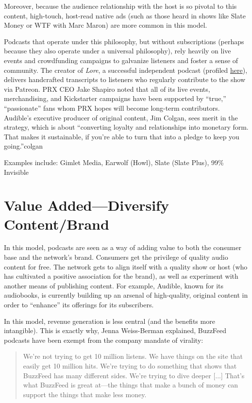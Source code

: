 \documentclass[notoc, symmetric, nobib, nols]{towcenter-guideto-book}
\begin{document}
Moreover, because the audience relationship with the host is so pivotal to this content, high-touch, host-read native ads (such as those heard in shows like Slate Money or WTF with Marc Maron) are more common in this model. 

Podcasts that operate under this philosophy, but without subscriptions (perhaps because they also operate under a universal philosophy), rely heavily on live events and crowdfunding campaigns to galvanize listeners and foster a sense of community. The creator of \textit{Lore}, a successful independent podcast (profiled \href{http://towcenter.org/case-study-lore/}{here}), delivers handcrafted transcripts to listeners who regularly contribute to the show via Patreon.\autocite{lore} PRX CEO Jake Shapiro noted that all of its live events, merchandising, and Kickstarter campaigns have been supported by ``true,'' ``passionate'' fans whom PRX hopes will become long-term contributors.\autocite{shapiro} Audible's executive producer of original content, Jim Colgan, sees merit in the strategy, which is about ``converting loyalty and relationships into monetary form. That makes it sustainable, if you're able to turn that into a pledge to keep you going.''{colgan}

Examples include: Gimlet Media, Earwolf (Howl), Slate (Slate Plus), 99\% Invisible

\section{Value Added---Diversify Content/Brand}

In this model, podcasts are seen as a way of adding value to both the consumer base and the network's brand. Consumers get the privilege of quality audio content for free. The network gets to align itself with a quality show or host (who has cultivated a positive association for the brand), as well as experiment with another means of publishing content. For example, Audible, known for its audiobooks, is currently building up an arsenal of high-quality, original content in order to ``enhance'' its offerings for its subscribers.\autocite{nuzum} 

In this model, revenue generation is less central (and the benefits more intangible). This is exactly why, Jenna Weiss-Berman explained, BuzzFeed podcasts have been exempt from the company mandate of virality: 

\begin{quote}
We're not trying to get 10 million listens. We have things on the site that easily get 10 million hits. We're trying to do something that shows that BuzzFeed has many different sides. We're trying to dive deeper [...] That's what BuzzFeed is great at---the things that make a bunch of money can support the things that make less money.\autocite{wb}
\end{quote}
\end{document}
